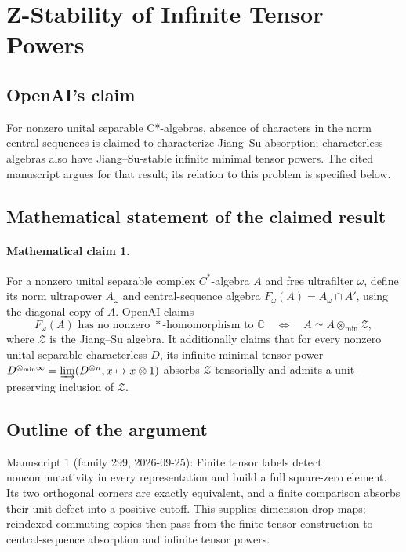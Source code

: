 \documentclass[11pt]{article}
\begin{document}
\section*{Z-Stability of Infinite Tensor Powers}

\subsection{OpenAI's claim}
For nonzero unital separable C*-algebras, absence of characters in the norm central sequences is claimed to characterize Jiang--Su absorption; characterless algebras also have Jiang--Su-stable infinite minimal tensor powers. The cited manuscript argues for that result; its relation to this problem is specified below.

\subsection{Mathematical statement of the claimed result}
\paragraph{Mathematical claim 1.} For a nonzero unital separable complex $C^*$-algebra $A$ and free ultrafilter $\omega$, define its norm ultrapower $A_\omega$ and central-sequence algebra $F_\omega(A)=A_\omega\cap A'$, using the diagonal copy of $A$. OpenAI claims
\[
F_\omega(A)\text{ has no nonzero }*\text{-homomorphism to }\mathbb C
\quad\Longleftrightarrow\quad A\simeq A\otimes_{\min}\mathcal Z,
\]
where $\mathcal Z$ is the Jiang--Su algebra. It additionally claims that for every nonzero unital separable characterless $D$, its infinite minimal tensor power $D^{\otimes_{\min}\infty}=\varinjlim(D^{\otimes n},x\mapsto x\otimes1)$ absorbs $\mathcal Z$ tensorially and admits a unit-preserving inclusion of $\mathcal Z$.

\subsection{Outline of the argument}
Manuscript 1 (family 299, 2026-09-25): Finite tensor labels detect noncommutativity in every representation and build a full square-zero element. Its two orthogonal corners are exactly equivalent, and a finite comparison absorbs their unit defect into a positive cutoff. This supplies dimension-drop maps; reindexed commuting copies then pass from the finite tensor construction to central-sequence absorption and infinite tensor powers.
\end{document}
